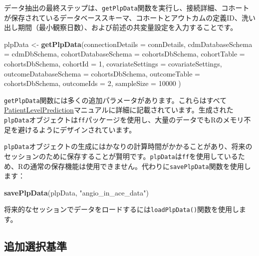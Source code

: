 \documentclass[
  11pt]{book}
\newenvironment{Shaded}{\begin{snugshade}}{\end{snugshade}}
\newcommand{\AttributeTok}[1]{\textcolor[rgb]{0.13,0.29,0.53}{#1}}
\newcommand{\DecValTok}[1]{\textcolor[rgb]{0.00,0.00,0.81}{#1}}
\newcommand{\FunctionTok}[1]{\textcolor[rgb]{0.13,0.29,0.53}{\textbf{#1}}}
\newcommand{\NormalTok}[1]{#1}
\newcommand{\OtherTok}[1]{\textcolor[rgb]{0.56,0.35,0.01}{#1}}
\newcommand{\StringTok}[1]{\textcolor[rgb]{0.31,0.60,0.02}{#1}}
\theoremstyle{definition}
\theoremstyle{definition}
\theoremstyle{definition}
\theoremstyle{definition}
\theoremstyle{remark}
\begin{document}
データ抽出の最終ステップは、\texttt{getPlpData}関数を実行し、接続詳細、コホートが保存されているデータベーススキーマ、コホートとアウトカムの定義ID、洗い出し期間（最小観察日数）、および前述の共変量設定を入力することです。

\begin{Shaded}
\begin{Highlighting}[]
\NormalTok{plpData }\OtherTok{\textless{}{-}} \FunctionTok{getPlpData}\NormalTok{(}\AttributeTok{connectionDetails =}\NormalTok{ connDetails,}
                      \AttributeTok{cdmDatabaseSchema =}\NormalTok{ cdmDbSchema,}
                      \AttributeTok{cohortDatabaseSchema =}\NormalTok{ cohortsDbSchema,}
                      \AttributeTok{cohortTable =}\NormalTok{ cohortsDbSchema,}
                      \AttributeTok{cohortId =} \DecValTok{1}\NormalTok{,}
                      \AttributeTok{covariateSettings =}\NormalTok{ covariateSettings,}
                      \AttributeTok{outcomeDatabaseSchema =}\NormalTok{ cohortsDbSchema,}
                      \AttributeTok{outcomeTable =}\NormalTok{ cohortsDbSchema,}
                      \AttributeTok{outcomeIds =} \DecValTok{2}\NormalTok{,}
                      \AttributeTok{sampleSize =} \DecValTok{10000}
\NormalTok{)}
\end{Highlighting}
\end{Shaded}

\texttt{getPlpData}関数には多くの追加パラメータがあります。これらはすべて\href{https://ohdsi.github.io/PatientLevelPrediction/}{PatientLevelPrediction}マニュアルに詳細に記載されています。生成された\texttt{plpData}オブジェクトは\texttt{ff}パッケージを使用し、大量のデータでもRのメモリ不足を避けるようにデザインされています。

\texttt{plpData}オブジェクトの生成にはかなりの計算時間がかかることがあり、将来のセッションのために保存することが賢明です。\texttt{plpData}は\texttt{ff}を使用しているため、Rの通常の保存機能は使用できません。代わりに\texttt{savePlpData}関数を使用します：

\begin{Shaded}
\begin{Highlighting}[]
\FunctionTok{savePlpData}\NormalTok{(plpData, }\StringTok{"angio\_in\_ace\_data"}\NormalTok{)}
\end{Highlighting}
\end{Shaded}

将来的なセッションでデータをロードするには\texttt{loadPlpData()}関数を使用します。

\subsection{追加選択基準}\label{ux8ffdux52a0ux9078ux629eux57faux6e96}
\end{document}
